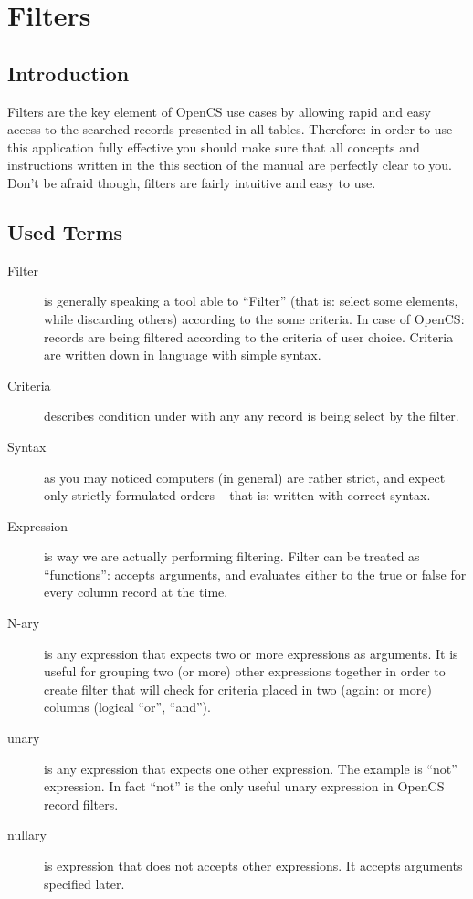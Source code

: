 \section{Filters}
\subsection{Introduction}
Filters are the key element of OpenCS use cases by allowing rapid and easy access to the searched records presented in all tables. Therefore: in order to use this application fully effective you should make sure that all concepts and instructions written in the this section of the manual are perfectly clear to you.\\
Don't be afraid though, filters are fairly intuitive and easy to use.

\subsection{Used Terms}

\begin{description}
 \item[Filter] is generally speaking a tool able to ``Filter'' (that is: select some elements, while discarding others) according to the some criteria. In case of OpenCS: records are being filtered according to the criteria of user choice. Criteria are written down in language with simple syntax.
 \item[Criteria] describes condition under with any any record is being select by the filter.
 \item[Syntax] as you may noticed computers (in general) are rather strict, and expect only strictly formulated orders -- that is: written with correct syntax.
 \item[Expression] is way we are actually performing filtering. Filter can be treated as ``functions'': accepts arguments, and evaluates either to the true or false for every column record at the time.
 \item[N-ary] is any expression that expects two or more expressions as arguments. It is useful for grouping two (or more) other expressions together in order to create filter that will check for criteria placed in two (again: or more) columns (logical ``or'', ``and'').
 \item[unary] is any expression that expects one other expression. The example is ``not'' expression. In fact ``not'' is the only useful unary expression in OpenCS record filters.
 \item[nullary] is expression that does not accepts other expressions. It accepts arguments specified later.
\end{description}

